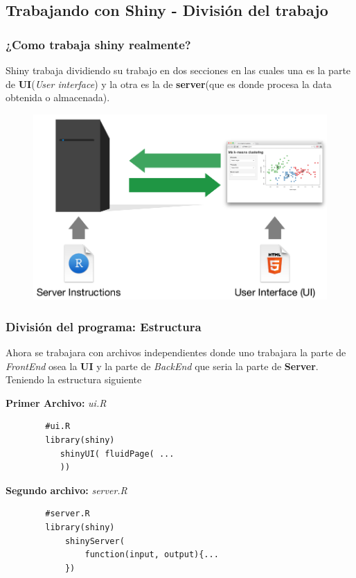 \documentclass{beamer}
\begin{document}
\subsection{Trabajando con Shiny - División del trabajo}
\begin{frame}
	\frametitle{¿Como trabaja shiny realmente? }
	Shiny trabaja  dividiendo su trabajo en dos secciones en las cuales una es la parte de \textbf{UI}(\textit{User interface}) y la otra es la de \textbf{server}(que es donde procesa la data obtenida o almacenada).
	
	\begin{figure}[h!]
		\includegraphics[scale=0.2]{arquitectura}
	\end{figure}
\end{frame}
\begin{frame}[fragile]
	\frametitle{División del programa: Estructura}
	Ahora se trabajara con archivos independientes donde uno trabajara la parte de \textit{FrontEnd} osea la \textbf{UI} y la parte de \textit{BackEnd} que seria la parte de \textbf{Server}. Teniendo la estructura siguiente
	
\textbf{	Primer Archivo:}\textit{ ui.R}
	\begin{verbatim}
		#ui.R
		library(shiny)
		   shinyUI( fluidPage( ...
		   ))
	\end{verbatim}
	
\textbf{	Segundo archivo:}\textit{ server.R}
	\begin{verbatim}
		#server.R
		library(shiny)
		    shinyServer(
		        function(input, output){...
		    })
	\end{verbatim}
		
\end{frame}
\end{document}

